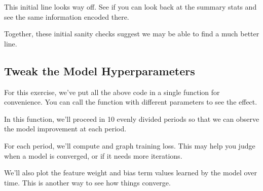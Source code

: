 \documentclass[11pt]{article}
\begin{document}
    This initial line looks way off. See if you can look back at the summary
stats and see the same information encoded there.

Together, these initial sanity checks suggest we may be able to find a
much better line.

    \hypertarget{tweak-the-model-hyperparameters}{%
\subsection{Tweak the Model
Hyperparameters}\label{tweak-the-model-hyperparameters}}

For this exercise, we've put all the above code in a single function for
convenience. You can call the function with different parameters to see
the effect.

In this function, we'll proceed in 10 evenly divided periods so that we
can observe the model improvement at each period.

For each period, we'll compute and graph training loss. This may help
you judge when a model is converged, or if it needs more iterations.

We'll also plot the feature weight and bias term values learned by the
model over time. This is another way to see how things converge.
\end{document}
